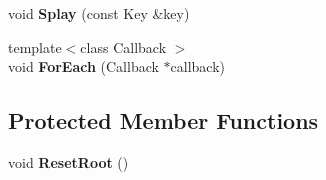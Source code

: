 \begin{DoxyCompactItemize}
\item 
void {\bfseries Splay} (const Key \&key)\hypertarget{classv8_1_1internal_1_1_splay_tree_aea827bdddbd85bf3b188f8b6c9a5a298}{}\label{classv8_1_1internal_1_1_splay_tree_aea827bdddbd85bf3b188f8b6c9a5a298}

\item 
{\footnotesize template$<$class Callback $>$ }\\void {\bfseries For\+Each} (Callback $\ast$callback)\hypertarget{classv8_1_1internal_1_1_splay_tree_a86bc3543b4ba7a00ea043ce4b08d8fae}{}\label{classv8_1_1internal_1_1_splay_tree_a86bc3543b4ba7a00ea043ce4b08d8fae}

\end{DoxyCompactItemize}
\subsection*{Protected Member Functions}
\begin{DoxyCompactItemize}
\item 
void {\bfseries Reset\+Root} ()\hypertarget{classv8_1_1internal_1_1_splay_tree_a2c43926f549f2cc564e6b66fe5fdd040}{}\label{classv8_1_1internal_1_1_splay_tree_a2c43926f549f2cc564e6b66fe5fdd040}

\end{DoxyCompactItemize}

